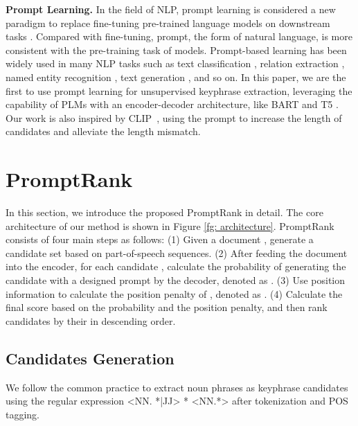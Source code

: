 \documentclass[11pt]{article}
\begin{document}
{\bf Prompt Learning.} In the field of NLP, prompt learning is considered a new paradigm to replace fine-tuning pre-trained language models on downstream tasks \cite{liu2021pre}. Compared with fine-tuning, prompt, the form of natural language, is more consistent with the pre-training task of models. Prompt-based learning has been widely used in many NLP tasks such as text classification \cite{gao-etal-2021-making, schick-schutze-2021-exploiting}, relation extraction \cite{chen2022knowprompt}, named entity recognition \cite{cui-etal-2021-template}, text generation \cite{li-liang-2021-prefix}, and so on. In this paper, we are the first to use prompt learning for unsupervised keyphrase extraction, leveraging the capability of PLMs with an encoder-decoder architecture, like BART \cite{lewis-etal-2020-bart} and T5 \cite{raffel2020exploring}. Our work is also inspired by CLIP~\cite{clip}, using the prompt to increase the length of candidates and alleviate the length mismatch. 






\section{PromptRank}



In this section, we introduce the proposed PromptRank in detail. The core architecture of our method is shown in Figure \ref{fg: architecture}. PromptRank consists of four main steps as follows: (1) Given a document , generate a candidate set  based on part-of-speech sequences. (2) After feeding the document into the encoder, for each candidate , calculate the probability of generating the candidate with a designed prompt by the decoder, denoted as . (3) Use position information to calculate the position penalty of , denoted as . (4) Calculate the final score  based on the probability and the position penalty, and then rank candidates by their  in descending order.

\subsection{Candidates Generation}
\label{section: 3.1}

We follow the common practice \cite{bennani-smires-etal-2018-simple, 8954611, zhang-etal-2022-mderank} to extract noun phrases as keyphrase candidates using the regular expression <NN. *|JJ> * <NN.*> after tokenization and POS tagging.
\end{document}
